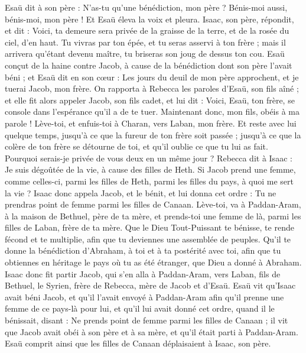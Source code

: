 \begin{multicols}{2}
Esaü dit à son père : N'as-tu qu'une bénédiction, mon père ? Bénis-moi aussi, bénis-moi, mon père ! Et Esaü éleva la voix et pleura.
Isaac, son père, répondit, et dit : Voici, ta demeure sera privée de la graisse de la terre, et de la rosée du ciel, d'en haut.
Tu vivras par ton épée, et tu seras asservi à ton frère ; mais il arrivera qu'étant devenu maître, tu briseras son joug de dessus ton cou.
Esaü conçut de la haine contre Jacob, à cause de la bénédiction dont son père l'avait béni ; et Esaü dit en son cœur : Les jours du deuil de mon père approchent, et je tuerai Jacob, mon frère.
On rapporta à Rebecca les paroles d'Esaü, son fils aîné ; et elle fit alors appeler Jacob, son fils cadet, et lui dit : Voici, Esaü, ton frère, se console dans l'espérance qu'il a de te tuer.
Maintenant donc, mon fils, obéis à ma parole ! Lève-toi, et enfuis-toi à Charan, vers Laban, mon frère.
Et reste avec lui quelque temps, jusqu'à ce que la fureur de ton frère soit passée ;
jusqu'à ce que la colère de ton frère se détourne de toi, et qu'il oublie ce que tu lui as fait. Pourquoi serais-je privée de vous deux en un même jour ?
Rebecca dit à Isaac : Je suis dégoûtée de la vie, à cause des filles de Heth. Si Jacob prend une femme, comme celles-ci, parmi les filles de Heth, parmi les filles du pays, à quoi me sert la vie ?
\VerseOne{}Isaac donc appela Jacob, et le bénit, et lui donna cet ordre : Tu ne prendras point de femme parmi les filles de Canaan.
Lève-toi, va à Paddan-Aram, à la maison de Bethuel, père de ta mère, et prends-toi une femme de là, parmi les filles de Laban, frère de ta mère.
Que le Dieu Tout-Puissant te bénisse, te rende fécond et te multiplie, afin que tu deviennes une assemblée de peuples.
Qu'il te donne la bénédiction d'Abraham, à toi et à ta postérité avec toi, afin que tu obtiennes en héritage le pays où tu as été étranger, que Dieu a donné à Abraham.
Isaac donc fit partir Jacob, qui s'en alla à Paddan-Aram, vers Laban, fils de Bethuel, le Syrien, frère de Rebecca, mère de Jacob et d'Esaü.
Esaü vit qu'Isaac avait béni Jacob, et qu'il l'avait envoyé à Paddan-Aram afin qu'il prenne une femme de ce pays-là pour lui, et qu'il lui avait donné cet ordre, quand il le bénissait, disant : Ne prends point de femme parmi les filles de Canaan ;
il vit que Jacob avait obéi à son père et à sa mère, et qu'il était parti à Paddan-Aram.
Esaü comprit ainsi que les filles de Canaan déplaisaient à Isaac, son père.

\end{multicols}
